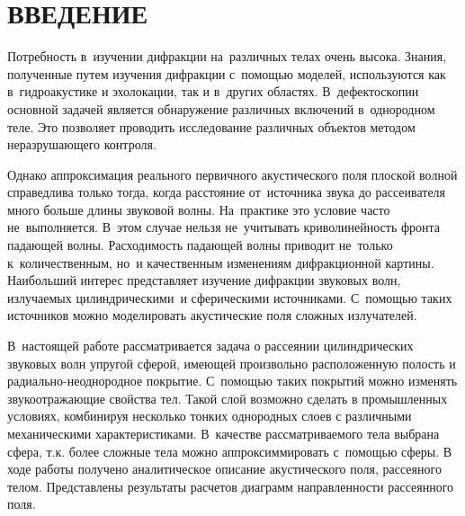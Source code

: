 

\renewcommand{\bibname}{СПИСОК ИСПОЛЬЗОВАННЫХ ИСТОЧНИКОВ}
\renewcommand\refname{СПИСОК ИСПОЛЬЗОВАННЫХ ИСТОЧНИКОВ}

%

\setcounter{page}{2}
\thispagestyle {empty}
\renewcommand{\contentsname}{\centering СОДЕРЖАНИЕ}
\tableofcontents

\newpage
\section*{ВВЕДЕНИЕ}
Потребность в~изучении дифракции на~различных телах очень высока. Знания, полученные путем изучения дифракции с~помощью моделей, используются как в~гидроакустике и эхолокации, так и в~других областях. В~дефектоскопии основной задачей является обнаружение различных включений в~однородном теле. Это позволяет проводить исследование различных объектов методом неразрушающего контроля.

Однако аппроксимация реального первичного акустического поля
плоской волной справедлива только тогда, когда расстояние от~источника звука до рассеивателя много больше длины звуковой волны. На~практике это условие часто не~выполняется. В~этом случае нельзя не~учитывать криволинейность фронта падающей волны. Расходимость падающей волны приводит не~только к~количественным, но~и качественным изменениям дифракционной картины. Наибольший интерес представляет изучение дифракции звуковых волн, излучаемых цилиндрическими~и
сферическими источниками. С~помощью таких источников можно моделировать акустические поля сложных излучателей.


В~настоящей работе рассматривается задача о рассеянии цилиндрических звуковых волн упругой сферой, имеющей произвольно расположенную полость и радиально-неоднородное покрытие. С~помощью таких покрытий можно изменять звукоотражающие свойства тел. Такой слой возможно сделать в промышленных условиях, комбинируя несколько тонких однородных слоев с различными механическими характеристиками. В~качестве рассматриваемого тела выбрана сфера, т.к. более сложные тела можно аппроксиммировать с~помощью сферы. В ходе работы получено аналитическое описание акустического поля, рассеяного телом. Представлены результаты расчетов диаграмм направленности рассеянного поля.


\newpage
